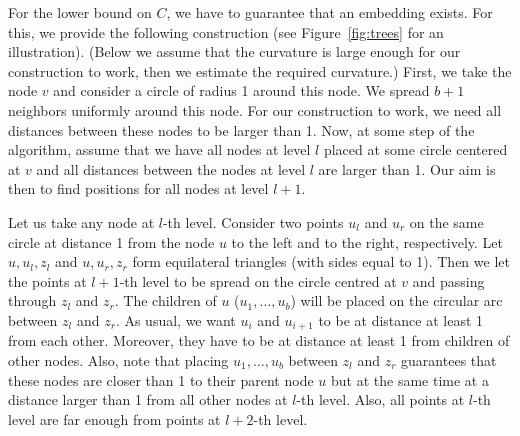 \documentclass{article} %
\begin{document}
For the lower bound on $C$, we have to guarantee that an embedding exists. For this, we provide the following construction (see Figure~\ref{fig:trees} for an illustration).
(Below we assume that the curvature is large enough for our construction to work, then we estimate the required curvature.)
First, we take the node $v$ and consider a circle of radius 1 around this node. 
We spread $b + 1$ neighbors uniformly around this node. For our construction to work, we need all distances between these nodes to be larger than 1.
Now, at some step of the algorithm, assume that we have all nodes at level $l$ placed at some circle centered at $v$ and all distances between the nodes at level $l$ are larger than 1. Our aim is then to find positions for all nodes at level $l + 1$.

Let us take any node at $l$-th level. Consider two points $u_l$ and $u_r$ on the same circle at distance 1 from the node $u$ to the left and to the right, respectively.
Let $u,u_l,z_l$ and $u,u_r,z_r$ form equilateral triangles (with sides equal to 1). Then we let the points at $l+1$-th level to be spread on the circle centred at $v$ and passing through $z_l$ and $z_r$. The children of $u$ ($u_1, \ldots, u_{b}$) will be placed on the circular arc between $z_l$ and $z_r$. As usual, we want $u_i$ and $u_{i+1}$ to be at distance at least 1 from each other. Moreover, they have to be at distance at least 1 from children of other nodes. Also, note that placing $u_1, \ldots, u_{b}$ between $z_l$ and $z_r$ guarantees that these nodes are closer than 1 to their parent node $u$ but at the same time at a distance larger than 1 from all other nodes at $l$-th level. Also, all points at $l$-th level are far enough from points at $l+2$-th level. 
\end{document}
